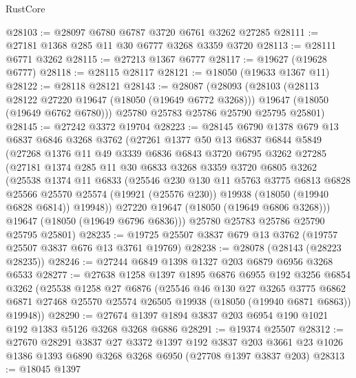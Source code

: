 \begin{lexlean}{RustCore}
\begin{coremodule}
@28103 := @28097 @6780 @6787 @3720 @6761 @3262 @27285
@28111 := @27181 @1368 @285 @11 @30 @6777 @3268 @3359 @3720
@28113 := @28111 @6771 @3262
@28115 := @27213 @1367 @6777
@28117 := @19627 (@19628 @6777)
@28118 := @28115 @28117
@28121 := @18050 (@19633 @1367 @11)
@28122 := @28118 @28121
@28143 := @28087
    (@28093
      (@28103
        (@28113 @28122 @27220 @19647 (@18050 (@19649 @6772 @3268)))
        @19647
        (@18050 (@19649 @6762 @6780)))
      @25780
      @25783
      @25786
      @25790
      @25795
      @25801)
@28145 := @27242 @3372 @19704
@28223 := @28145
    @6790
    @1378
    @679
    @13
    @6837
    @6846
    @3268
    @3762
    (@27261
      @1377
      @50
      @13
      @6837
      @6844
      @5849
      (@27268
        @1376
        @11
        @49
        @3339
        @6836
        @6843
        @3720
        @6795
        @3262
        @27285
        (@27181
          @1374
          @285
          @11
          @30
          @6833
          @3268
          @3359
          @3720
          @6805
          @3262
          (@25538
            @1374
            @11
            @6833
            (@25546
              @230
              @130
              @11
              @5763
              @3775
              @6813
              @6828
              @25566
              @25570
              @25574
              (@19921 (@25576 @230))
              @19938
              (@18050 (@19940 @6828 @6814))
              @19948))
          @27220
          @19647
          (@18050 (@19649 @6806 @3268)))
        @19647
        (@18050 (@19649 @6796 @6836)))
      @25780
      @25783
      @25786
      @25790
      @25795
      @25801)
@28235 := @19725 @25507 @3837 @679 @13 @3762 (@19757 @25507 @3837 @676 @13 @3761 @19769)
@28238 := @28078 (@28143 (@28223 @28235))
@28246 := @27244 @6849 @1398 @1327 @203 @6879 @6956 @3268 @6533
@28277 := @27638
    @1258
    @1397
    @1895
    @6876
    @6955
    @192
    @3256
    @6854
    @3262
    (@25538
      @1258
      @27
      @6876
      (@25546
        @46
        @130
        @27
        @3265
        @3775
        @6862
        @6871
        @27468
        @25570
        @25574
        @26505
        @19938
        (@18050 (@19940 @6871 @6863))
        @19948))
@28290 := @27674 @1397 @1894 @3837 @203 @6954 @190 @1021 @192 @1383 @5126 @3268 @3268 @6886
@28291 := @19374 @25507
@28312 := @27670
    @28291
    @3837
    @27
    @3372
    @1397
    @192
    @3837
    @203
    @3661
    @23
    @1026
    @1386
    @1393
    @6890
    @3268
    @3268
    @6950
    (@27708 @1397 @3837 @203)
@28313 := @18045 @1397

\end{coremodule}
\end{lexlean}
